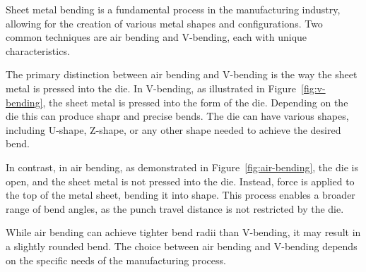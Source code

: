 Sheet metal bending is a fundamental process in the manufacturing industry, allowing for the creation of various
metal shapes and configurations. Two common techniques are air bending and V-bending, each with unique characteristics.

The primary distinction between air bending and V-bending is the way the sheet metal is pressed into the die. In
V-bending, as illustrated in Figure~\ref{fig:v-bending}, the sheet metal is pressed into the form of the die.
Depending on the die this can produce shapr and precise bends.
The die can have various shapes, including U-shape, Z-shape, or any other shape needed to achieve the desired bend.

In contrast, in air bending, as demonstrated in Figure~\ref{fig:air-bending}, the die is open, and the sheet metal is
not pressed into the die.
Instead, force is applied to the top of the metal sheet, bending it into shape.
This process enables a broader range of bend angles, as the punch travel distance is not restricted by the die.

While air bending can achieve tighter bend radii than V-bending, it may result in a slightly rounded bend. The choice
between air bending and V-bending depends on the specific needs of the manufacturing process.

